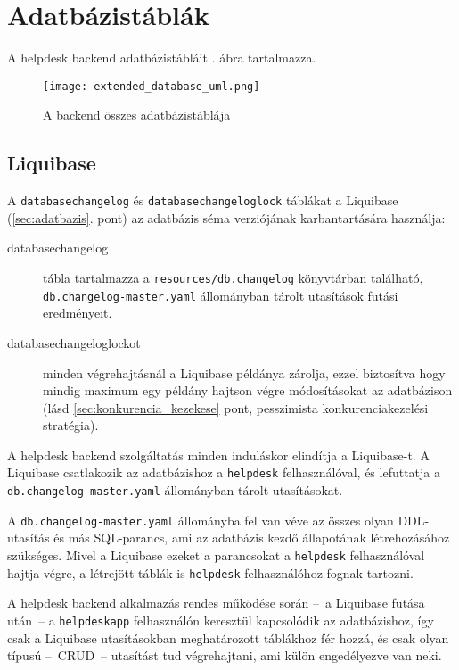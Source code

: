 \section{Adatbázistáblák}
A helpdesk backend adatbázistábláit . ábra tartalmazza.

\begin{figure}[hbt] 
	\centering
	\texttt{[image: extended\_database\_uml.png]}
	\caption{A backend összes adatbázistáblája}
	\label{fig:extended_database_uml}
\end{figure}


\subsection{Liquibase}\label{sec:liquibase}
A \texttt{databasechangelog} és \texttt{databasechangeloglock} táblákat a Liquibase (\ref{sec:adatbazis}. pont) az adatbázis séma verziójának karbantartására használja:
\begin{description}
	\item[databasechangelog] tábla tartalmazza a \mbox{\texttt{resources/db.changelog}} könyvtárban található,  \mbox{\texttt{db.changelog-master.yaml}} állományban tárolt utasítások futási eredményeit.
	
	\item[databasechangeloglockot] minden végrehajtásnál a Liquibase példánya  zárolja, ezzel biztosítva hogy mindig maximum egy példány hajtson végre módosításokat az adatbázison (lásd \ref{sec:konkurencia_kezekese} pont, pesszimista konkurenciakezelési stratégia).
\end{description}

A helpdesk backend szolgáltatás minden induláskor elindítja a Liquibase-t. A Liquibase csatlakozik az adatbázishoz a \texttt{helpdesk} felhasználóval, és lefuttatja a \mbox{\texttt{db.changelog-master.yaml}} állományban tárolt utasításokat.

A \mbox{\texttt{db.changelog-master.yaml}} állományba fel van véve az összes olyan DDL-utasítás és más SQL-parancs, ami az adatbázis kezdő állapotának létrehozásához szükséges. Mivel a Liquibase ezeket a parancsokat a \texttt{helpdesk} felhasználóval hajtja végre, a létrejött táblák is \texttt{helpdesk} felhasználóhoz fognak tartozni. 

A helpdesk backend alkalmazás rendes működése során --~a Liquibase futása után~--   a \texttt{helpdesk\textunderscore app} felhasználón keresztül kapcsolódik az adatbázishoz, így csak a Liquibase utasításokban meghatározott táblákhoz fér hozzá, és csak olyan típusú --~CRUD~--   utasítást tud végrehajtani, ami külön engedélyezve van neki.

